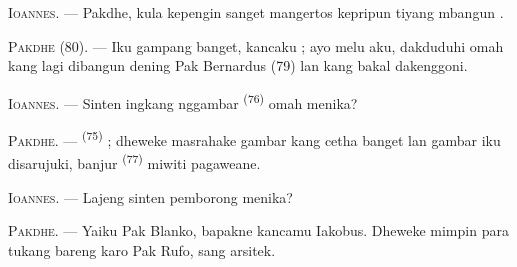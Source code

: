 %
%

\VUsaut{6.0mm}
\VUsaut{1.4mm}
\VUsaut{2.2mm}

\VUsaut{3.0mm}

\textsc{Ioannes}. --- Pakdhe, kula kepengin sanget mangertos kepripun
tiyang mbangun .

\textsc{Pakdhe} (80). --- Iku gampang banget, kancaku ; ayo melu aku,
dakduduhi omah kang lagi dibangun dening Pak Bernardus (79) lan kang
bakal dakenggoni.

\textsc{Ioannes}. --- Sinten ingkang nggambar 
\textsuperscript{(76)} omah menika?

\textsc{Pakdhe}. ---  \textsuperscript{(75)} ; dheweke
masrahake gambar kang cetha banget lan gambar iku disarujuki, banjur
 \textsuperscript{(77)} miwiti pagaweane.

\textsc{Ioannes}. --- Lajeng sinten pemborong menika?

\textsc{Pakdhe}. --- Yaiku Pak Blanko, bapakne kancamu Iakobus. Dheweke
mimpin para tukang bareng karo Pak Rufo, sang arsitek.

